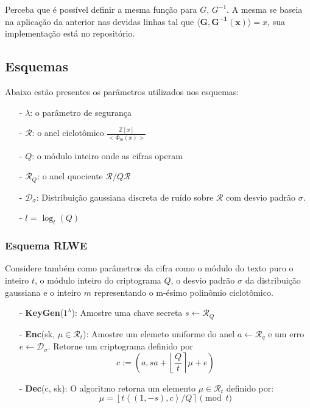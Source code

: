 Perceba que é possível definir a mesma função para $G$, $G^{-1}$. A mesma se baseia na aplicação da anterior nas devidas linhas 
tal que $\langle \mathbf{G}, \mathbf{G^{-1}(x)} \rangle = x$, sua implementação está no repositório.

\subsection{Esquemas}
Abaixo estão presentes os parâmetros utilizados nos esquemas:

\begin{itemize}[itemsep=0pt, parsep=0pt]
    \item[-] $\lambda$: o parâmetro de segurança
    \item[-] $\mathcal{R}$: o anel ciclotômico $\frac{\mathbb{Z}[x]}{<\Phi_{m}(x)>}$
    \item[-] $Q$: o módulo inteiro onde as cifras operam
    \item[-] $\mathcal{R}_{Q}$: o anel quociente $\mathcal{R}/Q\mathcal{R}$
    \item[-] $\mathcal{D_{\sigma}}$: Distribuição gaussiana discreta de ruído sobre $\mathcal{R}$ com desvio padrão $\sigma$.
    \item[-] $l$ = $\log_t(Q)$  
\end{itemize}

\subsubsection{Esquema RLWE}

Considere também como parâmetros da cifra como o módulo do texto puro o inteiro $t$, o módulo inteiro do criptograma $Q$,
o desvio padrão $\sigma$ da distribuição gaussiana e o inteiro $m$ representando o m-ésimo polinômio ciclotômico.   

\begin{itemize}[itemsep=0pt, parsep=0pt]
    \item[-] \textbf{KeyGen}($1^{\lambda}$): Amostre uma chave secreta $s \leftarrow \mathcal{R}_Q$
    \item[-] \textbf{Enc}(sk, $\mu \in \mathcal{R}_t$): Amostre um elemeto uniforme do anel $a \leftarrow \mathcal{R}_q$ e
um erro $e \leftarrow \mathcal{D_{\sigma}}$. Retorne um criptograma definido por 
    $$
    c := (a, sa + \left\lfloor \frac{Q}{t} \right\rceil \mu + e)
    $$
    \item[-] \textbf{Dec}(c, sk): O algoritmo retorna um elemento $\mu \in \mathcal{R}_t$ definido por:
    $$
        \mu = \left\lfloor t \left\langle (1,-s),c \right\rangle/Q \right\rceil  \pmod{t}  
    $$
\end{itemize}

